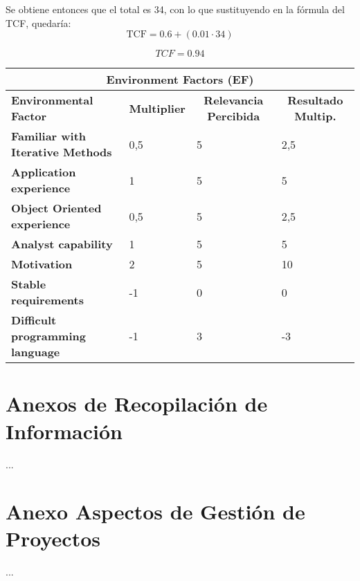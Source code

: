 Se obtiene entonces que el total es 34, con lo que sustituyendo en la fórmula del TCF, quedaría:
\[
\text{TCF} = 0.6+(0.01\cdot34)
\]

\[
TCF = 0.94
\]

\begin{center}
  \begin{tabular}{ | p{4cm} | p{2cm} | p{4cm}| p{4cm} | } 
    \hline
    \multicolumn{4}{|c|}{\textbf{Environment Factors (EF)}} \\
    \hline
    \multicolumn{1}{|p{3cm}|}{\textbf{Environmental Factor}} & \multicolumn{1}{|c|}{\textbf{Multiplier}} & \multicolumn{1}{|c|}{\textbf{Relevancia Percibida}} & \multicolumn{1}{|c|}{\textbf{Resultado Multip.}} \\
    \hline
    
    {\textbf{Familiar with Iterative Methods}} & 0,5 & 5 & 2,5 \\ \hline
    {\textbf{Application experience}} & 1 & 5 & 5 \\ \hline
    {\textbf{Object Oriented experience}} & 0,5 & 5 & 2,5 \\ \hline
    {\textbf{Analyst capability}} & 1 & 5 & 5 \\ \hline
    {\textbf{Motivation}} & 2 & 5 & 10 \\ \hline
    {\textbf{Stable requirements}} & -1 & 0 & 0 \\ \hline
    {\textbf{Difficult programming language}} & -1 & 3 & -3 \\ \hline
  \end{tabular}
  
    \label{table:ef}
\end{center}

\section{Anexos de Recopilación de Información}
...

\section{Anexo Aspectos de Gestión de Proyectos}
...

\newpage

